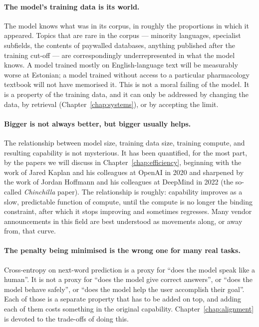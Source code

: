 \paragraph{The model's training data is its world.}
The model knows what was in its corpus, in roughly the
proportions in which it appeared. Topics that are rare in the
corpus --- minority languages, specialist subfields, the
contents of paywalled databases, anything published after the
training cut-off --- are correspondingly underrepresented in
what the model knows. A model trained mostly on English-language
text will be measurably worse at Estonian; a model trained
without access to a particular pharmacology textbook will not
have memorised it. This is not a moral failing of the model. It
is a property of the training data, and it can only be
addressed by changing the data, by retrieval (Chapter~\ref{chap:systems}), or
by accepting the limit.

\paragraph{Bigger is not always better, but bigger usually
helps.} The relationship between model size, training data
size, training compute, and resulting capability is not
mysterious. It has been quantified, for the most part, by the
papers we will discuss in Chapter~\ref{chap:efficiency}, beginning with the work
of Jared Kaplan and his colleagues at OpenAI in 2020 and
sharpened by the work of Jordan Hoffmann and his colleagues at
DeepMind in 2022 (the so-called \emph{Chinchilla} paper). The
relationship is roughly: capability improves as a slow,
predictable function of compute, until the compute is no longer
the binding constraint, after which it stops improving and
sometimes regresses. Many vendor announcements in this field
are best understood as movements along, or away from, that
curve.

\paragraph{The penalty being minimised is the wrong one for many
real tasks.} Cross-entropy on next-word prediction is a proxy
for ``does the model speak like a human''. It is not a proxy
for ``does the model give correct answers'', or ``does the
model behave safely'', or ``does the model help the user
accomplish their goal''. Each of those is a separate property
that has to be added on top, and adding each of them costs
something in the original capability. Chapter~\ref{chap:alignment} is devoted to
the trade-offs of doing this.

